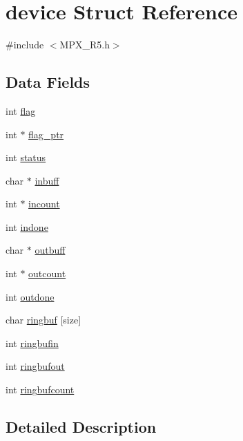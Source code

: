 \hypertarget{structdevice}{
\section{device Struct Reference}
\label{structdevice}
}


{\ttfamily \#include $<$MPX\_\-R5.h$>$}

\subsection*{Data Fields}
\begin{DoxyCompactItemize}
\item 
int \hyperlink{structdevice_ac2d4a1d39c1a5a858d88f2482d6900c8}{flag}
\item 
int $\ast$ \hyperlink{structdevice_aa14e67b7bd4e2bc5751268f0be91983f}{flag\_\-ptr}
\item 
int \hyperlink{structdevice_aaaefcdae0117d89bef5340a1e3f432e1}{status}
\item 
char $\ast$ \hyperlink{structdevice_a031f8856932341c5b5bf979b4da0d5df}{inbuff}
\item 
int $\ast$ \hyperlink{structdevice_ab46085fdbca4da85dfbbbf7baafc4612}{incount}
\item 
int \hyperlink{structdevice_aff338e9d555a8f740e997650a862b523}{indone}
\item 
char $\ast$ \hyperlink{structdevice_a32acea82810b51d93df2d3ced6cdffb7}{outbuff}
\item 
int $\ast$ \hyperlink{structdevice_ae597c46dee282a47174100b12525b424}{outcount}
\item 
int \hyperlink{structdevice_ab7c43127bcb340d678131fd04c37ba05}{outdone}
\item 
char \hyperlink{structdevice_add9c4fe8b331128af0f655bc74410ffd}{ringbuf} \mbox{[}size\mbox{]}
\item 
int \hyperlink{structdevice_a87b6f10cd47f45a38cfa264c298acc04}{ringbufin}
\item 
int \hyperlink{structdevice_ac5f863bd4d89e6182fb4c517d93afb8e}{ringbufout}
\item 
int \hyperlink{structdevice_ad06a8146a22a605c0f463b212774cc92}{ringbufcount}
\end{DoxyCompactItemize}


\subsection{Detailed Description}


